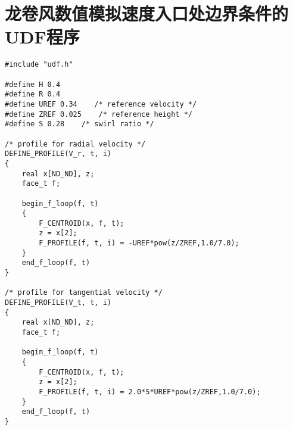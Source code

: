 \chapter{龙卷风数值模拟速度入口处边界条件的UDF程序}
\begin{verbatim}
#include "udf.h"

#define H 0.4
#define R 0.4
#define UREF 0.34    /* reference velocity */
#define ZREF 0.025    /* reference height */
#define S 0.28    /* swirl ratio */

/* profile for radial velocity */
DEFINE_PROFILE(V_r, t, i)
{
    real x[ND_ND], z;
    face_t f;

    begin_f_loop(f, t)
    {
        F_CENTROID(x, f, t);
        z = x[2];
        F_PROFILE(f, t, i) = -UREF*pow(z/ZREF,1.0/7.0);
    }
    end_f_loop(f, t)
}

/* profile for tangential velocity */
DEFINE_PROFILE(V_t, t, i)
{
    real x[ND_ND], z;
    face_t f;

    begin_f_loop(f, t)
    {
        F_CENTROID(x, f, t);
        z = x[2];
        F_PROFILE(f, t, i) = 2.0*S*UREF*pow(z/ZREF,1.0/7.0);
    }
    end_f_loop(f, t)
}

\end{verbatim}
